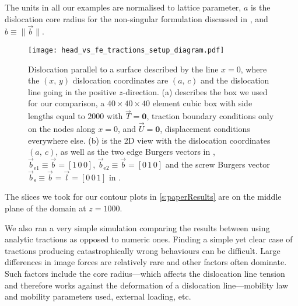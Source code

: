 The units in all our examples are normalised to lattice parameter, $a$ is the dislocation core radius for the non-singular formulation discussed in \cite{a_non-singular_continuum_theory_of_dislocations}, and $b \equiv \lVert \vec{b} \rVert$.

\begin{figure}
    \centering
    \texttt{[image: head\_vs\_fe\_tractions\_setup\_diagram.pdf]}
    \caption[Set up comparing infinite-domain, singular solutions of stress fields to those obtained via a non-singular formulation with analytic and numeric tractions coupled to FEM.]{Dislocation parallel to a surface described by the line $x = 0$, where the $(x,\,y)$ dislocation coordinates are $(a,\,c)$ and the dislocation line going in the positive $z$-direction. (a) describes the box we used for our comparison, a  $40 \times 40 \times 40$ element cubic box with side lengths equal to $2000$ with $\vec{T} = \bm{0}$, traction boundary conditions only on the nodes along $x = 0$, and $\vec{U} = \bm{0}$, displacement conditions everywhere else. (b) is the 2D view with the dislocation coordinates $(a,~c)$, as well as the two edge Burgers vectors in \cite{head1953edge}, $\vec{b}_\textrm{e1} \equiv \vec{b} = [1\, 0\, 0]$, $\vec{b}_\textrm{e2} \equiv \vec{b} = [0\, 1\, 0]$ and the screw Burgers vector $\vec{b}_\textrm{s} \equiv \vec{b} = \vec{l} = [0\, 0\, 1] $ in \cite[p.~59,~64]{hirth1983theory}.}
    \label{f:headvstractionfem}
\end{figure}

The slices we took for our contour plots in \cref{s:paperResults} are on the middle plane of the domain at $z = 1000$.

We also ran a very simple simulation comparing the results between using analytic tractions as opposed to numeric ones. Finding a simple yet clear case of tractions producing catastrophically wrong behaviours can be difficult. Large differences in image forces are relatively rare and other factors often dominate. Such factors include the core radius---which affects the dislocation line tension and therefore works against the deformation of a dislocation line---mobility law and mobility parameters used, external loading, etc.


